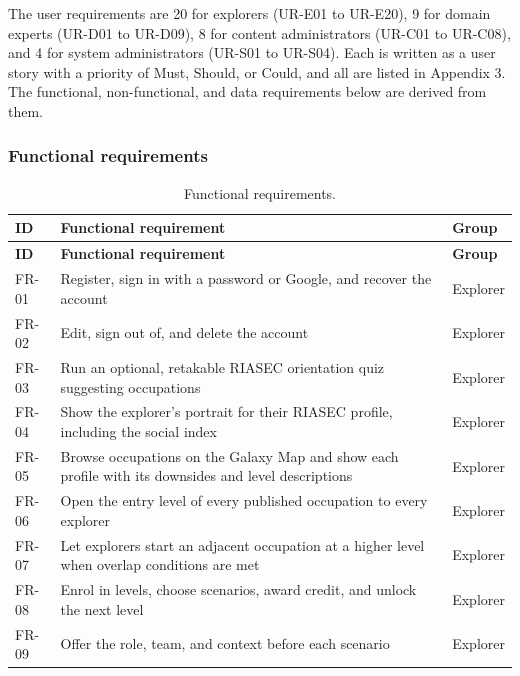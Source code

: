 The user requirements are 20 for explorers (UR-E01 to UR-E20), 9 for domain experts (UR-D01 to UR-D09), 8 for content administrators (UR-C01 to UR-C08), and 4 for system administrators (UR-S01 to UR-S04). Each is written as a user story with a priority of Must, Should, or Could, and all are listed in Appendix 3. The functional, non-\allowbreak{}functional, and data requirements below are derived from them.

\subsubsection{Functional requirements}

{\small{}\renewcommand{\arraystretch}{1.1}
\begin{longtable}{|>{\raggedright\arraybackslash}p{}|>{\raggedright\arraybackslash}p{}|>{\raggedright\arraybackslash}p{}|}
\caption{Functional requirements.} \\
\hline
\textbf{ID} & \textbf{Functional requirement} & \textbf{Group} \\ \hline
\endfirsthead
\hline
\textbf{ID} & \textbf{Functional requirement} & \textbf{Group} \\ \hline
\endhead
FR-01 & Register, sign in with a password or Google, and recover the account & Explorer \\ \hline
FR-02 & Edit, sign out of, and delete the account & Explorer \\ \hline
FR-03 & Run an optional, retakable RIASEC orientation quiz suggesting occupations\cite{r41} & Explorer \\ \hline
FR-04 & Show the explorer's portrait for their RIASEC profile, including the social index & Explorer \\ \hline
FR-05 & Browse occupations on the Galaxy Map and show each profile with its downsides and level descriptions & Explorer \\ \hline
FR-06 & Open the entry level of every published occupation to every explorer & Explorer \\ \hline
FR-07 & Let explorers start an adjacent occupation at a higher level when overlap conditions are met & Explorer \\ \hline
FR-08 & Enrol in levels, choose scenarios, award credit, and unlock the next level & Explorer \\ \hline
FR-09 & Offer the role, team, and context before each scenario & Explorer \\ \hline

\end{longtable}}
